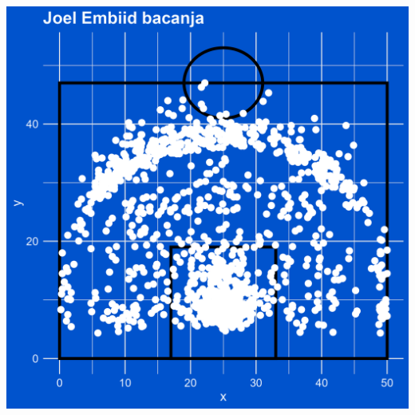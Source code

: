 \documentclass[letterpaper,11pt,leqno]{article}
\begin{document}
\begin{center}
    \includegraphics[scale=1]{Teren.png}
\end{center}
\end{document}
